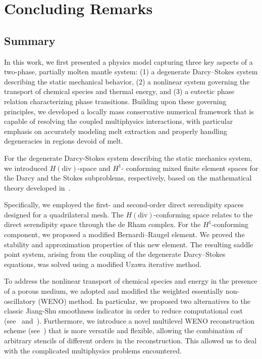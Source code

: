 \chapter{Concluding Remarks}
\label{chap:concluding}
\section{Summary}
In this work, we first presented a physics model capturing three key aspects of a 
two-phase, partially molten mantle system: (1) a degenerate Darcy–Stokes system 
describing the static mechanical behavior, (2) a nonlinear  
system governing the transport of chemical species and thermal energy, 
and (3) a eutectic phase relation characterizing phase transitions.
Building upon these governing principles, we developed a locally mass conservative 
numerical framework that is capable of resolving the coupled multiphysics interactions, 
with particular emphasis on accurately modeling melt extraction and properly handling degeneracies in regions devoid of melt.

For the degenerate Darcy-Stokes system describing the static mechanics system, 
we introduced $H(\text{div})$-space and $H^1$-
conforming mixed finite element spaces for the Darcy and the Stokes subproblems,
respectively, based on the mathematical theory developed in~\cite{DegenerateDarcy}. 

Specifically, we employed the first- and second-order direct serendipity spaces designed for a quadrilateral mesh.
The $H(\text{div})$-conforming space relates to the direct serendipity space through the de Rham complex. 
For the $H^1$-conforming component, 
we proposed a modified Bernardi–Raugel element. We proved the stability and approximation properties of this 
new element. The resulting saddle point system, arising from the coupling of the 
degenerate Darcy–Stokes equations, was solved using a modified Uzawa iterative method. 

To address the nonlinear transport of chemical species and energy in the 
presence of a porous medium, we adopted and modified the weighted essentially 
non-oscillatory (WENO) method. In particular, 
we proposed two alternatives to the classic Jiang-Shu smoothness indicator in order to 
reduce computational cost (see~\cite{WENOAOSimplifiedSmoothness} and~\cite{sigmaP}). 
Furthermore, we introduce a novel multilevel WENO reconstruction 
scheme (see~\cite{MultiLevelWeno}) that is more versatile and flexible, allowing the combination of 
arbitrary stencils of different orders in the reconstruction. This allowed us to deal 
with the complicated
multiphysics problems encountered.


